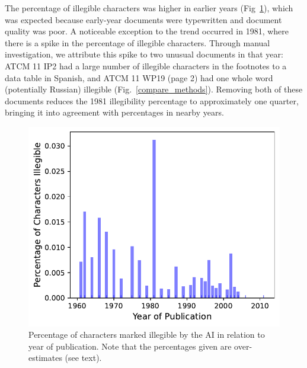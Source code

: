 \documentclass[12pt]{article}
\begin{document}
\newpage
The percentage of illegible characters was higher in earlier years
(Fig~\ref{percentage_illegible_v_year}),
which was expected because early-year documents were typewritten
and document quality was poor.
A noticeable exception to the trend occurred in 1981,
where there is a spike in the percentage of illegible characters.
Through manual investigation,
we attribute this spike to two unusual documents in that year:
ATCM 11 IP2
had a large number of illegible characters in 
the footnotes to a data table in Spanish,
and ATCM 11 WP19 (page 2) had one whole word (potentially Russian)
illegible (Fig.~\ref{compare_methods}). 
Removing both of these documents reduces the 1981 illegibility
percentage to approximately one quarter, 
bringing it into agreement with percentages in nearby years.

\begin{figure}[h]
    \begin{minipage}[b]{0.40\textwidth}
        \caption{
            Percentage of characters marked illegible by the AI
            in relation to year of publication.
            Note that the percentages given are over-estimates
            (see text).
        } \label{percentage_illegible_v_year}
    \end{minipage}
    \hfill
    \begin{minipage}[b]{0.55\textwidth}
        \includegraphics[width=\textwidth]{../results_describe_data/percentage_illegible_v_year.pdf}
    \end{minipage}
\end{figure}
\end{document}
